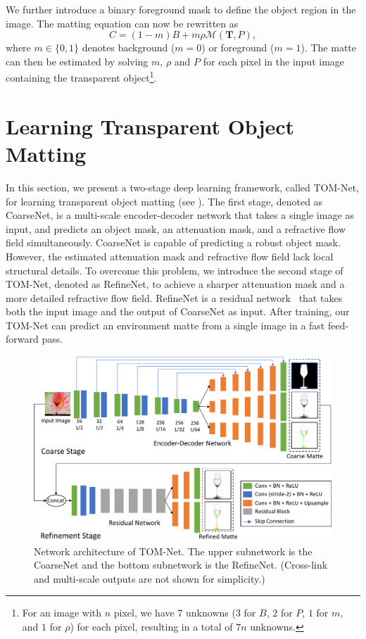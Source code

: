 We further introduce a binary foreground mask to define the object region in the image. The matting equation can now be rewritten as
\begin{equation}
    \label{eq:em_simplify3}
    C = (1 - m) B + m\rho \mathcal{M}(\mathbf{T}, P),
\end{equation}
where $m \in\{0, 1\}$ denotes background ($m = 0$) or foreground ($m = 1$). The matte can then be estimated by solving $m$, $\rho$ and $P$ for each pixel in the input image containing the transparent 
object\footnote{For an image with $n$ pixel, we have $7$ unknowns ($3$ for $B$, $2$ for $P$, $1$ for $m$, and $1$ for $\rho$) for each pixel, resulting in a total of $7n$ unknowns.}.


\section{Learning Transparent Object Matting}
\label{sec:method}
In this section, we present a two-stage deep learning framework, called TOM-Net, for learning transparent object matting (see ). The first stage, denoted as CoarseNet, is a multi-scale encoder-decoder network that takes a single image as input, and predicts an object mask, an attenuation mask, and a refractive flow field simultaneously. CoarseNet is capable of predicting a robust object mask. However, the estimated attenuation mask and refractive flow field lack local structural details. 
To overcome this problem, we introduce the second stage of TOM-Net, denoted as RefineNet, to achieve a sharper attenuation mask and a more detailed refractive flow field. RefineNet is a residual network~\cite{he2016deep} that takes both the input image and the output of CoarseNet as input. After training, our TOM-Net can predict an environment matte from a single image in a fast feed-forward pass.

\begin{figure}[tbp] \centering
    \includegraphics[width=\textwidth]{ch-tomnet/images/Method/TOMNet_framework.pdf}
    \caption[Network architecture of TOM-Net]{Network architecture of TOM-Net. The upper subnetwork is the CoarseNet and the bottom subnetwork is the RefineNet. (Cross-link and multi-scale outputs are not shown for simplicity.)} \label{fig:networkStructure}
\end{figure}

